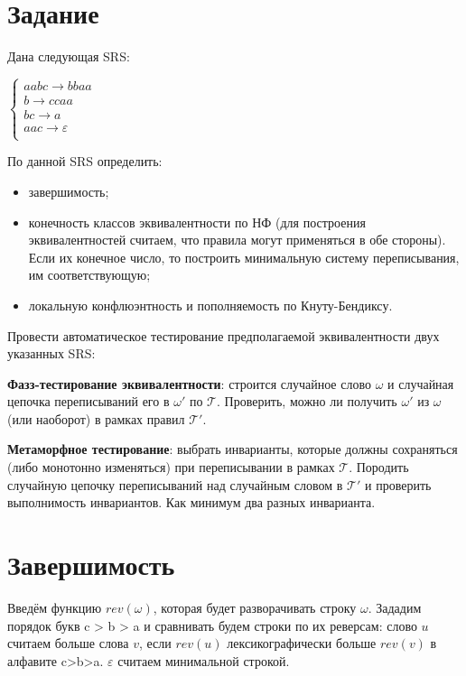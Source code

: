\documentclass[12pt]{article}
\begin{document}
\clearpage
\newpage

\section{Задание}

Дана следующая SRS:

$\begin{cases}

aabc \rightarrow bbaa\\

b \rightarrow ccaa\\

bc \rightarrow a\\

aac \rightarrow \varepsilon\\

\end{cases}$

\vspace{7px}
\noindent
По данной SRS определить:

\begin{itemize}
    \item {завершимость;}
    \item {конечность классов эквивалентности по НФ (для построения эквивалентностей считаем, что правила могут применяться в обе стороны). Если их конечное число, то построить минимальную систему переписывания, им соответствующую;}
    \item{локальную конфлюэнтность и пополняемость по Кнуту-Бендиксу.}
\end{itemize}

Провести автоматическое тестирование предполагаемой эквивалентности двух
указанных SRS:

\textbf{Фазз-тестирование эквивалентности}: строится случайное слово $\omega$ и случайная цепочка переписываний его в $\omega'$ по $\mathcal{T}$. Проверить, можно ли получить $\omega'$ из $\omega$ (или наоборот) в рамках правил $\mathcal{T}'$.

\textbf{Метаморфное тестирование}: выбрать инварианты, которые должны сохраняться (либо монотонно изменяться) при переписывании в рамках $\mathcal{T}$. Породить случайную цепочку переписываний над случайным словом в $\mathcal{T}'$ и проверить выполнимость инвариантов. Как минимум два разных инварианта. 

\section{Завершимость}
\hspace{20px} Введём функцию $rev(\omega)$, которая будет разворачивать строку $\omega$. Зададим порядок букв c > b > a и сравнивать будем строки по их реверсам: слово $u$ считаем больше слова $v$, если $rev(u)$ лексикографически больше $rev(v)$ в алфавите c>b>a. $\varepsilon$ считаем минимальной строкой.
\end{document}

